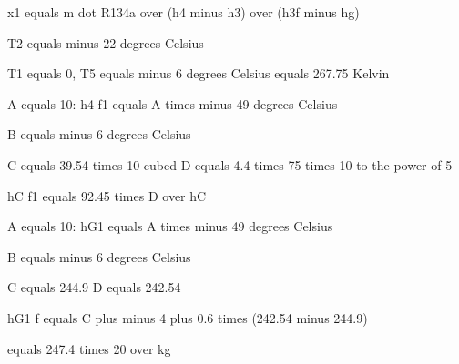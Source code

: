 x1 equals m dot R134a over (h4 minus h3) over (h3f minus hg)  

T2 equals minus 22 degrees Celsius  

T1 equals 0, T5 equals minus 6 degrees Celsius equals 267.75 Kelvin  

A equals 10:  
h4 f1 equals A times minus 49 degrees Celsius  

B equals minus 6 degrees Celsius  

C equals 39.54 times 10 cubed  
D equals 4.4 times 75 times 10 to the power of 5  

hC f1 equals 92.45 times D over hC  

A equals 10:  
hG1 equals A times minus 49 degrees Celsius  

B equals minus 6 degrees Celsius  

C equals 244.9  
D equals 242.54  

hG1 f equals C plus minus 4 plus 0.6 times (242.54 minus 244.9)  

equals 247.4 times 20 over kg